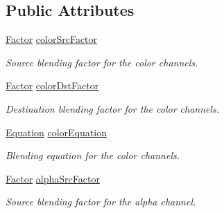 \subsection*{Public Attributes}
\begin{DoxyCompactItemize}
\item 
\mbox{\label{structsf_1_1_blend_mode_a32d1a55dbfada86a06d9b881dc8ccf7b}} 
\hyperlink{structsf_1_1_blend_mode_afb9852caf356b53bb0de460c58a9ebbb}{Factor} \hyperlink{structsf_1_1_blend_mode_a32d1a55dbfada86a06d9b881dc8ccf7b}{color\+Src\+Factor}
\begin{DoxyCompactList}\small\item\em Source blending factor for the color channels. \end{DoxyCompactList}\item 
\mbox{\label{structsf_1_1_blend_mode_adee68ee59e7f1bf71d12db03d251104d}} 
\hyperlink{structsf_1_1_blend_mode_afb9852caf356b53bb0de460c58a9ebbb}{Factor} \hyperlink{structsf_1_1_blend_mode_adee68ee59e7f1bf71d12db03d251104d}{color\+Dst\+Factor}
\begin{DoxyCompactList}\small\item\em Destination blending factor for the color channels. \end{DoxyCompactList}\item 
\mbox{\label{structsf_1_1_blend_mode_aed12f06eb7f50a1b95b892b0964857b1}} 
\hyperlink{structsf_1_1_blend_mode_a7bce470e2e384c4f9c8d9595faef7c32}{Equation} \hyperlink{structsf_1_1_blend_mode_aed12f06eb7f50a1b95b892b0964857b1}{color\+Equation}
\begin{DoxyCompactList}\small\item\em Blending equation for the color channels. \end{DoxyCompactList}\item 
\mbox{\label{structsf_1_1_blend_mode_aa94e44f8e1042a7357e8eff78c61a1be}} 
\hyperlink{structsf_1_1_blend_mode_afb9852caf356b53bb0de460c58a9ebbb}{Factor} \hyperlink{structsf_1_1_blend_mode_aa94e44f8e1042a7357e8eff78c61a1be}{alpha\+Src\+Factor}
\begin{DoxyCompactList}\small\item\em Source blending factor for the alpha channel. \end{DoxyCompactList}\item 

\end{DoxyCompactItemize}
